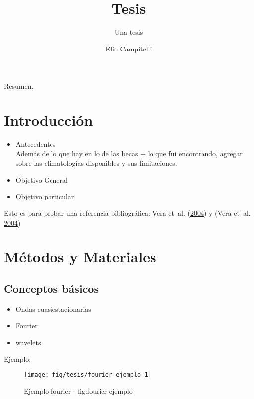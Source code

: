 \documentclass[spanish,a4paper]{book}
\title{Tesis}
\subtitle{Una tesis}
\author{Elio Campitelli}
\date{}
\providecommand{\tightlist}{%
  \setlength{\itemsep}{0pt}\setlength{\parskip}{0pt}}
\begin{document}
\maketitle

{
\setcounter{tocdepth}{3}
\tableofcontents
}
Resumen.


\chapter{Introducción}\label{introduccion}

\begin{itemize}
\tightlist
\item
  Antecedentes\\
  Además de lo que hay en lo de las becas + lo que fui encontrando,
  agregar sobre las climatologías disponibles y sus limitaciones.
\item
  Objetivo General
\item
  Objetivo particular
\end{itemize}

Esto es para probar una referencia bibliográfica: Vera et~al.
(\protect\hyperlink{ref-Vera2004}{2004}) y (Vera et~al.
\protect\hyperlink{ref-Vera2004}{2004})

\chapter{Métodos y Materiales}\label{metodos-y-materiales}

\section{Conceptos básicos}\label{conceptos-basicos}

\begin{itemize}
\tightlist
\item
  Ondas cuasiestacionarias
\item
  Fourier
\item
  wavelets
\end{itemize}


Ejemplo:

\begin{figure*}
\texttt{[image: fig/tesis/fourier-ejemplo-1]} \caption{Ejemplo fourier - fig:fourier-ejemplo}\label{fig:fourier-ejemplo}
\end{figure*}
\end{document}
